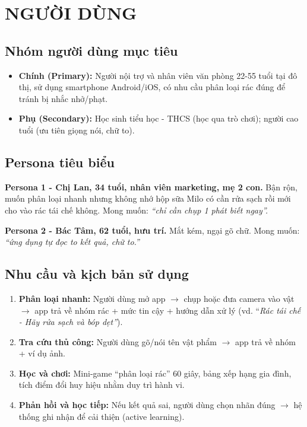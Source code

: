 \documentclass[13pt,a4paper,oneside]{report}
\begin{document}
\chapter{NGƯỜI DÙNG}

\section{Nhóm người dùng mục tiêu}

\begin{itemize}[leftmargin=1.5cm]
    \item \textbf{Chính (Primary):} Người nội trợ và nhân viên văn phòng 22-55 tuổi tại đô thị, sử dụng smartphone Android/iOS, có nhu cầu phân loại rác đúng để tránh bị nhắc nhở/phạt.
    \item \textbf{Phụ (Secondary):} Học sinh tiểu học - THCS (học qua trò chơi); người cao tuổi (ưu tiên giọng nói, chữ to).
\end{itemize}

\section{Persona tiêu biểu}

\textbf{Persona 1 - Chị Lan, 34 tuổi, nhân viên marketing, mẹ 2 con.} Bận rộn, muốn phân loại nhanh nhưng không nhớ hộp sữa Milo có cần rửa sạch rồi mới cho vào rác tái chế không. Mong muốn: \textit{``chỉ cần chụp 1 phát biết ngay''.}

\textbf{Persona 2 - Bác Tâm, 62 tuổi, hưu trí.} Mắt kém, ngại gõ chữ. Mong muốn: \textit{``ứng dụng tự đọc to kết quả, chữ to.''}

\section{Nhu cầu và kịch bản sử dụng}

\begin{enumerate}[label=\textbf{S\arabic*.}, leftmargin=1.5cm]
    \item \textbf{Phân loại nhanh:} Người dùng mở app $\rightarrow$ chụp hoặc đưa camera vào vật $\rightarrow$ app trả về nhóm rác + mức tin cậy + hướng dẫn xử lý (vd. ``\textit{Rác tái chế - Hãy rửa sạch và bóp dẹt''}).
    \item \textbf{Tra cứu thủ công:} Người dùng gõ/nói tên vật phẩm $\rightarrow$ app trả về nhóm + ví dụ ảnh.
    \item \textbf{Học và chơi:} Mini-game ``phân loại rác'' 60 giây, bảng xếp hạng gia đình, tích điểm đổi huy hiệu nhằm duy trì hành vi.
    \item \textbf{Phản hồi và học tiếp:} Nếu kết quả sai, người dùng chọn nhãn đúng $\rightarrow$ hệ thống ghi nhận để cải thiện (active learning).
\end{enumerate}
\end{document}
